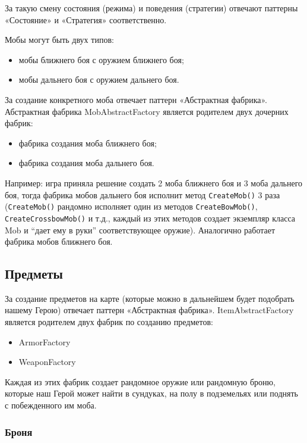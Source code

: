 \documentclass[a4paper,10pt]{article}
\begin{document}
За такую смену состояния (режима) и поведения (стратегии) отвечают паттерны «Состояние» и «Стратегия» соответственно.

Мобы могут быть двух типов:

\begin{itemize}
    \item мобы ближнего боя с оружием ближнего боя;
    \item мобы дальнего боя с оружием дальнего боя.
\end{itemize}

За создание конкретного моба отвечает паттерн «Абстрактная фабрика». Абстрактная фабрика MobAbstractFactory является родителем двух дочерних фабрик:


\begin{itemize}
    \item фабрика создания моба ближнего боя;
    \item фабрика создания моба дальнего боя.
\end{itemize}

Например: игра приняла решение создать 2 моба ближнего боя и 3 моба дальнего боя, тогда фабрика мобов дальнего боя исполнит метод \texttt{CreateMob()} 3 раза (\texttt{CreateMob()} рандомно исполняет один из методов \texttt{CreateBowMob()}, \texttt{CreateCrossbowMob()} и т.д., каждый из этих методов создает экземпляр класса Mob и “дает ему в руки” соответствующее оружие). Аналогично работает фабрика мобов ближнего боя. 


\subsection*{Предметы}

За создание предметов на карте (которые можно в дальнейшем будет подобрать нашему Герою) отвечает паттерн «Абстрактная фабрика». ItemAbstractFactory является родителем двух фабрик по созданию предметов:


\begin{itemize}
    \item ArmorFactory
    \item WeaponFactory
\end{itemize}

Каждая из этих фабрик создает рандомное оружие или рандомную броню, которые наш Герой может найти в сундуках, на полу в подземельях или поднять с побежденного им моба. 

\subsubsection*{Броня}
\end{document}

